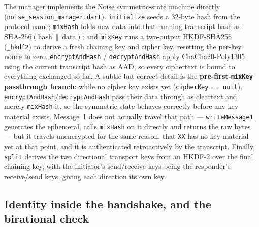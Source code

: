 \documentclass[11pt]{report}
\newcommand{\code}[1]{\texttt{\small #1}}
\begin{document}
The manager implements the Noise symmetric-state machine directly (\code{noise\_session\_manager.dart}). \code{initialize} seeds a 32-byte hash from the protocol name; \code{mixHash} folds new data into that running transcript hash as $\text{SHA-256}(\text{hash}\,\|\,\text{data})$; and \code{mixKey} runs a two-output HKDF-SHA256 (\code{\_hkdf2}) to derive a fresh chaining key and cipher key, resetting the per-key nonce to zero. \code{encryptAndHash} / \code{decryptAndHash} apply ChaCha20-Poly1305 using the current transcript hash as AAD, so every ciphertext is bound to everything exchanged so far. A subtle but correct detail is the \textbf{pre-first-\code{mixKey} passthrough branch}: while no cipher key exists yet (\code{cipherKey == null}), \code{encryptAndHash}/\code{decryptAndHash} pass their data through as cleartext and merely \code{mixHash} it, so the symmetric state behaves correctly before any key material exists. Message~1 does not actually travel that path --- \code{writeMessage1} generates the ephemeral, calls \code{mixHash} on it directly and returns the raw bytes --- but it travels unencrypted for the same reason, that \code{XX} has no key material yet at that point, and it is authenticated retroactively by the transcript. Finally, \code{split} derives the two directional transport keys from an HKDF-2 over the final chaining key, with the initiator's send/receive keys being the responder's receive/send keys, giving each direction its own key.

\subsection*{Identity inside the handshake, and the birational check}
\end{document}
